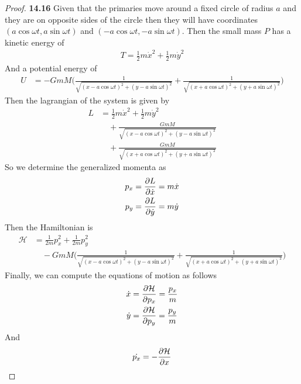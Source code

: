 \documentclass[11pt]{article}
\theoremstyle{definition}
\begin{document}
\begin{proof}{\textbf{14.16}}
    Given that the primaries move around a fixed circle of radius $a$ and they
    are on opposite sides of the circle then they will have coordinates
    $(a\cos \omega t, a\sin \omega t)$ and $(-a\cos \omega t, -a\sin \omega t)$.
    Then the small mass $P$ has a kinetic energy of
    \begin{align*}
        T = \frac{1}{2}m \dot{x}^2 + \frac{1}{2}m \dot{y}^2
    \end{align*}
    And a potential energy of
    \begin{align*}
        U &= -GmM\bigg(
            \frac{1}{\sqrt{(x - a\cos \omega t)^2 + (y - a\sin \omega t)^2}}
            + \frac{1}{\sqrt{(x + a\cos \omega t)^2 + (y + a\sin \omega t)^2}}
        \bigg)
    \end{align*}
    Then the lagrangian of the system is given by
    \begin{align*}
        L &= \frac{1}{2}m \dot{x}^2 + \frac{1}{2}m \dot{y}^2\\
         &\quad +
        \frac{GmM}{\sqrt{(x - a\cos \omega t)^2 + (y - a\sin \omega t)^2}}\\
        &\quad
        + \frac{GmM}{\sqrt{(x + a\cos \omega t)^2 + (y + a\sin \omega t)^2}}
    \end{align*}
    So we determine the generalized momenta as
    \begin{align*}
        p_x = \partialderivative{L}{\dot{x}} &= m \dot{x}\\
        p_y = \partialderivative{L}{\dot{y}} &= m \dot{y}
    \end{align*}
    Then the Hamiltonian is
    \begin{align*}
        \mathcal{H} &= \frac{1}{2m}p_x^2 + \frac{1}{2m} p_y^2\\
        &\quad - GmM\bigg(
       \frac{1}{\sqrt{(x - a\cos \omega t)^2 + (y - a\sin \omega t)^2}}
       + \frac{1}{\sqrt{(x + a\cos \omega t)^2 + (y + a\sin \omega t)^2}}
       \bigg)
    \end{align*}
    Finally, we can compute the equations of motion as follows
    \begin{align*}
        \dot{x} &=\partialderivative{\mathcal{H}}{p_x} = \frac{p_x}{m}\\
        \dot{y} &=\partialderivative{\mathcal{H}}{p_y} = \frac{p_y}{m}
    \end{align*}
    And 
    \begin{align*}
        \dot{p_x} &= -\partialderivative{\mathcal{H}}{x}\\

\end{align*}
\end{proof}
\end{document}
